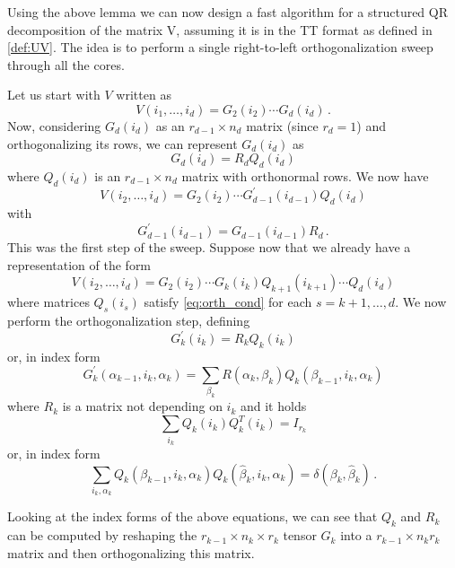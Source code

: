Using the above lemma we can now design a fast algorithm for a structured QR decomposition of the matrix V, assuming it is in the TT format as defined in \eqref{def:UV}. The idea is to perform a single right-to-left orthogonalization sweep through all the cores.

Let us start with $V$ written as
\begin{equation*}
  V(i_1,\ldots,i_d) = G_2(i_2) \cdots G_d(i_d)\, .
\end{equation*}
Now, considering $G_d(i_d)$ as an $r_{d-1} \times n_d$ matrix (since $r_d = 1$) and orthogonalizing its rows, we can represent $G_d(i_d)$ as
\begin{equation*}
  G_d(i_d) = R_d Q_d(i_d)
\end{equation*}
where $Q_d(i_d)$ is an $r_{d-1} \times n_d$ matrix with orthonormal rows.
We now have
\begin{equation*}
  V(i_2,\ldots,i_d) = G_2(i_2) \cdots G^\prime_{d-1}(i_{d-1}) Q_d(i_d)
\end{equation*}
with
\begin{equation*}
  G^\prime_{d-1}(i_{d-1}) = G_{d-1}(i_{d-1}) R_d\, .
\end{equation*}
This was the first step of the sweep. Suppose now that we already have a representation of the form
\begin{equation*}
  V(i_2,\ldots,i_d) = G_2(i_2) \cdots G_k(i_k) Q_{k+1}(i_{k+1}) \cdots Q_d(i_d)
\end{equation*}
where matrices $Q_s(i_s)$ satisfy \eqref{eq:orth_cond} for each $s = k+1, \ldots, d$. We now perform the orthogonalization step, defining
\begin{equation*}
  G^\prime_k(i_k) = R_k Q_k(i_k)
\end{equation*}
or, in index form
\begin{equation*}
  G^\prime_k (\alpha_{k-1},i_k,\alpha_k) = \sum_{\beta_k} R(\alpha_k,\beta_k) Q_k(\beta_{k-1},i_k,\alpha_k)
\end{equation*}
where $R_k$ is a matrix not depending on $i_k$ and it holds
\begin{equation*}
  \sum_{i_k} Q_k(i_k) Q_k^T(i_k) = I_{r_k}
\end{equation*}
or, in index form
\begin{equation*}
  \sum_{i_k,\alpha_k} Q_k(\beta_{k-1},i_k,\alpha_k)Q_k(\hat{\beta}_k,i_k,\alpha_k) = \delta(\beta_k,\hat{\beta}_k)\, .
\end{equation*}

Looking at the index forms of the above equations, we can see that $Q_k$ and $R_k$ can be computed by reshaping the $r_{k-1} \times n_k \times r_k$ tensor $G_k$ into a $r_{k-1} \times n_k r_k$ matrix and then orthogonalizing this matrix.

